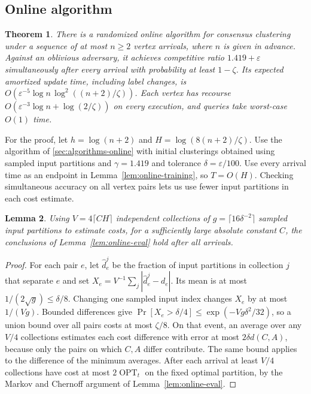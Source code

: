 \documentclass[11pt]{article}
\newtheorem{theorem}{Theorem}[section]
\newtheorem{lemma}[theorem]{Lemma}
\newcommand{\OPT}{\operatorname{OPT}}
\begin{document}
\subsection{Online algorithm}
\label{app:vote-online}

\begin{theorem}\label{joint:online}
There is a randomized online algorithm for consensus clustering under
a sequence of at most $n\ge2$ vertex arrivals, where $n$ is given in advance.
Against an oblivious adversary, it achieves competitive ratio
$1.419+\varepsilon$ simultaneously after every arrival with probability
at least $1-\zeta$. Its expected amortized update time, including label
changes, is
$O(\varepsilon^{-5}\log n\,\log^2((n+2)/\zeta))$.
Each vertex has recourse $O(\varepsilon^{-3}\log n+\log(2/\zeta))$
on every execution, and queries take worst-case $O(1)$ time.
\end{theorem}

For the proof, let $h=\log(n+2)$ and $H=\log(8(n+2)/\zeta)$.
Use the algorithm of \cref{sec:algorithms-online} with initial clusterings obtained using sampled input partitions and
$\gamma=1.419$ and tolerance $\delta=\varepsilon/100$. Use every
arrival time as an endpoint in Lemma~\ref{lem:online-training}, so
$T=O(H)$. Checking simultaneous accuracy on all vertex pairs
lets us use fewer input partitions in each cost estimate.

\begin{lemma}\label{lem:vote-validation}
Using $V=4\lceil C H\rceil$ independent collections of
$g=\lceil16\delta^{-2}\rceil$ sampled input partitions to estimate
costs, for a sufficiently large absolute constant $C$, the conclusions of Lemma~\ref{lem:online-eval} hold
after all arrivals.
\end{lemma}
\begin{proof}
For each pair $e$, let $\widehat d^j_e$ be the fraction of input partitions in
collection $j$ that separate $e$ and set $X_e=V^{-1}\sum_j|\widehat d^j_e-d_e|$.
Its mean is at most $1/(2\sqrt g)\le\delta/8$. Changing one
sampled input index changes $X_e$ by at most $1/(Vg)$. Bounded
differences give $\Pr[X_e>\delta/4]\le\exp(-Vg\delta^2/32)$, so a
union bound over all pairs costs at most $\zeta/8$. On that event,
an average over any $V/4$ collections estimates each cost difference
with error at most $2\delta d(C,A)$, because only the pairs on which
$C,A$ differ contribute. The same bound applies to the difference
of the minimum averages. After each arrival at least $V/4$ collections have
cost at most $2\OPT_t$ on the fixed optimal partition, by the Markov and
Chernoff argument of Lemma~\ref{lem:online-eval}.
\end{proof}
\end{document}
